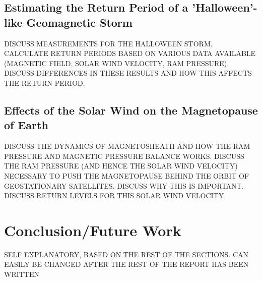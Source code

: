 \documentclass[11pt]{article}
\begin{document}
    \subsection{Estimating the Return Period of a 'Halloween'-like Geomagnetic Storm}\label{sec:halloween}
        DISCUSS MEASUREMENTS FOR THE HALLOWEEN STORM. CALCULATE RETURN PERIODS BASED ON VARIOUS DATA AVAILABLE (MAGNETIC FIELD, SOLAR WIND VELOCITY, RAM PRESSURE). DISCUSS DIFFERENCES IN THESE RESULTS AND HOW THIS AFFECTS THE RETURN PERIOD.
    \subsection{Effects of the Solar Wind on the Magnetopause of Earth}\label{sec:magnetoPAUSE}
        DISCUSS THE DYNAMICS OF MAGNETOSHEATH AND HOW THE RAM PRESSURE AND MAGNETIC PRESSURE BALANCE WORKS. DISCUSS THE RAM PRESSURE (AND HENCE THE SOLAR WIND VELOCITY) NECESSARY TO PUSH THE MAGNETOPAUSE BEHIND THE ORBIT OF GEOSTATIONARY SATELLITES. DISCUSS WHY THIS IS IMPORTANT. DISCUSS RETURN LEVELS FOR THIS SOLAR WIND VELOCITY.
\section{Conclusion/Future Work}\label{sec:conclusions}
    SELF EXPLANATORY, BASED ON THE REST OF THE SECTIONS. CAN EASILY BE CHANGED AFTER THE REST OF THE REPORT HAS BEEN WRITTEN
\newpage
{}



\end{document}

